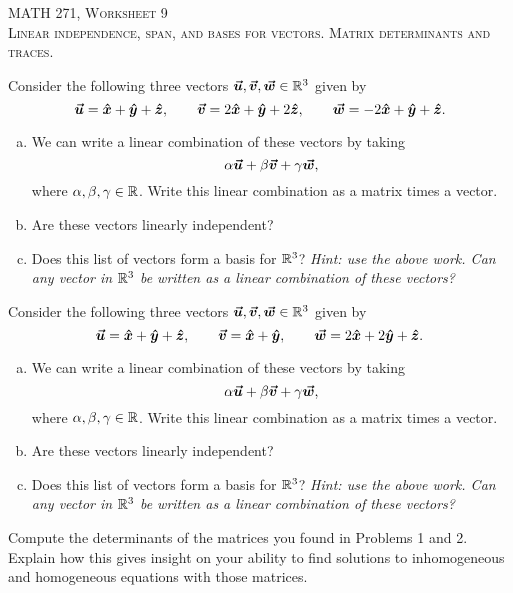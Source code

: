 \documentclass[12pt]{article} %
\begin{document}
\begin{center}
   \textsc{\large MATH 271, Worksheet 9}\\
   \textsc{Linear independence, span, and bases for vectors. Matrix determinants and traces.}
\end{center}
\vspace{.5cm}



\begin{problem}
Consider the following three vectors $\boldsymbol{\boldsymbol{\vec{u}}},\boldsymbol{\boldsymbol{\vec{v}}},\boldsymbol{\boldsymbol{\vec{w}}}\in \mathbb{R}^3$ given by
\[
\boldsymbol{\boldsymbol{\vec{u}}} = \boldsymbol{\hat{x}} + \boldsymbol{\hat{y}} +\boldsymbol{\hat{z}}, \qquad \boldsymbol{\boldsymbol{\vec{v}}} = 2\boldsymbol{\hat{x}} + \boldsymbol{\hat{y}} + 2\boldsymbol{\hat{z}}, \qquad \boldsymbol{\boldsymbol{\vec{w}}} = -2\boldsymbol{\hat{x}} + \boldsymbol{\hat{y}} +\boldsymbol{\hat{z}}. 
\]
\begin{enumerate}[(a)]
    \item We can write a linear combination of these vectors by taking
    \[
    \alpha \boldsymbol{\boldsymbol{\vec{u}}} + \beta \boldsymbol{\boldsymbol{\vec{v}}} + \gamma \boldsymbol{\boldsymbol{\vec{w}}},
    \]
    where $\alpha,\beta,\gamma \in \mathbb{R}$.  Write this linear combination as a matrix times a vector.
    \item Are these vectors linearly independent?
    \item Does this list of vectors form a basis for $\mathbb{R}^3$? \emph{Hint: use the above work. Can any vector in $\mathbb{R}^3$ be written as a linear combination of these vectors?}
\end{enumerate}
\end{problem}

\begin{problem}
Consider the following three vectors $\boldsymbol{\boldsymbol{\vec{u}}},\boldsymbol{\boldsymbol{\vec{v}}},\boldsymbol{\boldsymbol{\vec{w}}}\in \mathbb{R}^3$ given by
\[
\boldsymbol{\boldsymbol{\vec{u}}} = \boldsymbol{\hat{x}} + \boldsymbol{\hat{y}} +\boldsymbol{\hat{z}}, \qquad \boldsymbol{\boldsymbol{\vec{v}}} = \boldsymbol{\hat{x}} + \boldsymbol{\hat{y}}, \qquad \boldsymbol{\boldsymbol{\vec{w}}} = 2\boldsymbol{\hat{x}} + 2\boldsymbol{\hat{y}} +\boldsymbol{\hat{z}}. 
\]
\begin{enumerate}[(a)]
    \item We can write a linear combination of these vectors by taking
    \[
    \alpha \boldsymbol{\boldsymbol{\vec{u}}} + \beta \boldsymbol{\boldsymbol{\vec{v}}} + \gamma \boldsymbol{\boldsymbol{\vec{w}}},
    \]
    where $\alpha,\beta,\gamma \in \mathbb{R}$.  Write this linear combination as a matrix times a vector.
    \item Are these vectors linearly independent?
    \item Does this list of vectors form a basis for $\mathbb{R}^3$? \emph{Hint: use the above work. Can any vector in $\mathbb{R}^3$ be written as a linear combination of these vectors?}
\end{enumerate}
\end{problem}

\begin{problem}
Compute the determinants of the matrices you found in Problems 1 and 2.  Explain how this gives insight on your ability to find solutions to inhomogeneous and homogeneous equations with those matrices.
\end{problem}
\end{document}
